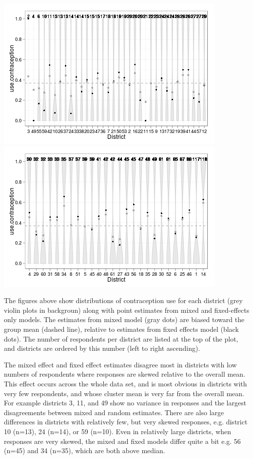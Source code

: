 \documentclass{article}
\makeatletter
\newenvironment{kframe}{%
 \def\FrameCommand##1{\hskip\@totalleftmargin \hskip-\fboxsep
 \colorbox{shadecolor}{##1}\hskip-\fboxsep
     \hskip-\linewidth \hskip-\@totalleftmargin \hskip\columnwidth}%
 \MakeFramed {\advance\hsize-\width
   \@totalleftmargin\z@ \linewidth\hsize
   \@setminipage}}%
 {\par\unskip\endMakeFramed}
\newenvironment{knitrout}{}{} %
\makeatother
\begin{document}
\begin{knitrout}
{\begin{kframe}
\centering{}\includegraphics{compare-plot1} \includegraphics{compare-plot2} 

\end{kframe}}
\end{knitrout}


The figures above show distributions of contraception use for each district (grey violin plots in backgroun) along with point estimates from mixed and fixed-effects only models. The estimates from mixed model (gray dots) are biased toward the group mean (dashed line), relative to estimates from fixed effects model (black dots).
The number of respondents per district are listed at the top of the plot, and districts are ordered by this number (left to right ascending).

The mixed effect and fixed effect estimates disagree most in districts with low numbers of respondents where responses are skewed relative to the overall mean. 
This effect occurs across the whole data set, and is most obvious in districts with very few respondents, and whose cluster mean is very far from the overall mean. 
For example districts 3, 11, and 49 show no variance in responses and the largest disagreements between mixed and random estimates. 
There are also large differences in districts with relatively few, but very skewed responses, e.g. district 10 (n=13), 24 (n=14), or 59 (n=10).
Even in relatively large districts, when responses are very skewed, the mixed and fixed models differ quite a bit e.g. 56 (n=45) and 34 (n=35), which are both above median.
\end{document}

